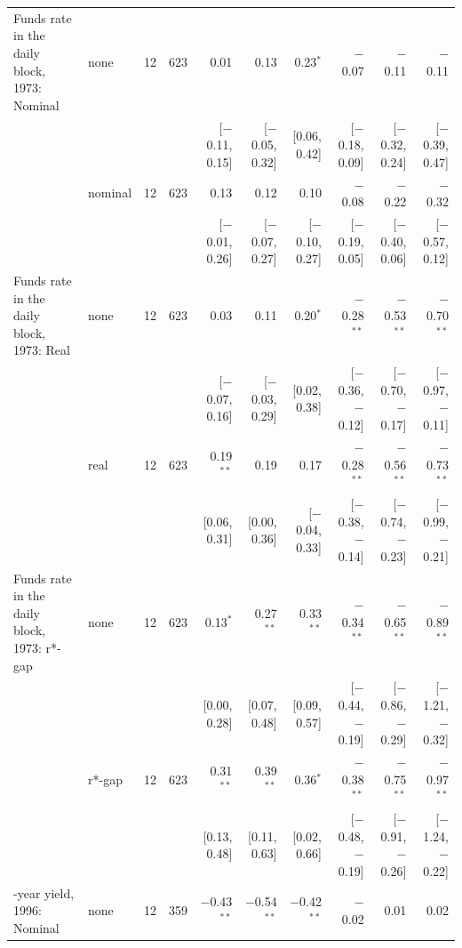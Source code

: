 \begin{table}[tp]
{\begin{tabular}{llcrrrrrrr}
\addlinespace
Funds rate in the daily block, 1973: Nominal & none & 12 & 623 & 0.01 & 0.13 & 0.23$^{*}$ & $-$0.07 & $-$0.11 & $-$0.11\\
 & & & & {\scriptsize [$-$0.11, 0.15]} & {\scriptsize [$-$0.05, 0.32]} & {\scriptsize [0.06, 0.42]} & {\scriptsize [$-$0.18, 0.09]} & {\scriptsize [$-$0.32, 0.24]} & {\scriptsize [$-$0.39, 0.47]}\\
 & nominal & 12 & 623 & 0.13 & 0.12 & 0.10 & $-$0.08 & $-$0.22 & $-$0.32\\
 & & & & {\scriptsize [$-$0.01, 0.26]} & {\scriptsize [$-$0.07, 0.27]} & {\scriptsize [$-$0.10, 0.27]} & {\scriptsize [$-$0.19, 0.05]} & {\scriptsize [$-$0.40, 0.06]} & {\scriptsize [$-$0.57, 0.12]}\\
\addlinespace
Funds rate in the daily block, 1973: Real & none & 12 & 623 & 0.03 & 0.11 & 0.20$^{*}$ & $-$0.28$^{**}$ & $-$0.53$^{**}$ & $-$0.70$^{**}$\\
 & & & & {\scriptsize [$-$0.07, 0.16]} & {\scriptsize [$-$0.03, 0.29]} & {\scriptsize [0.02, 0.38]} & {\scriptsize [$-$0.36, $-$0.12]} & {\scriptsize [$-$0.70, $-$0.17]} & {\scriptsize [$-$0.97, $-$0.11]}\\
 & real & 12 & 623 & 0.19$^{**}$ & 0.19 & 0.17 & $-$0.28$^{**}$ & $-$0.56$^{**}$ & $-$0.73$^{**}$\\
 & & & & {\scriptsize [0.06, 0.31]} & {\scriptsize [0.00, 0.36]} & {\scriptsize [$-$0.04, 0.33]} & {\scriptsize [$-$0.38, $-$0.14]} & {\scriptsize [$-$0.74, $-$0.23]} & {\scriptsize [$-$0.99, $-$0.21]}\\
\addlinespace
Funds rate in the daily block, 1973: r*-gap & none & 12 & 623 & 0.13$^{*}$ & 0.27$^{**}$ & 0.33$^{**}$ & $-$0.34$^{**}$ & $-$0.65$^{**}$ & $-$0.89$^{**}$\\
 & & & & {\scriptsize [0.00, 0.28]} & {\scriptsize [0.07, 0.48]} & {\scriptsize [0.09, 0.57]} & {\scriptsize [$-$0.44, $-$0.19]} & {\scriptsize [$-$0.86, $-$0.29]} & {\scriptsize [$-$1.21, $-$0.32]}\\
 & r*-gap & 12 & 623 & 0.31$^{**}$ & 0.39$^{**}$ & 0.36$^{*}$ & $-$0.38$^{**}$ & $-$0.75$^{**}$ & $-$0.97$^{**}$\\
 & & & & {\scriptsize [0.13, 0.48]} & {\scriptsize [0.11, 0.63]} & {\scriptsize [0.02, 0.66]} & {\scriptsize [$-$0.48, $-$0.19]} & {\scriptsize [$-$0.91, $-$0.26]} & {\scriptsize [$-$1.24, $-$0.22]}\\
\addlinespace
1-year yield, 1996: Nominal & none & 12 & 359 & $-$0.43$^{**}$ & $-$0.54$^{**}$ & $-$0.42$^{**}$ & $-$0.02 & 0.01 & 0.02\\

\end{tabular}}
\end{table}
